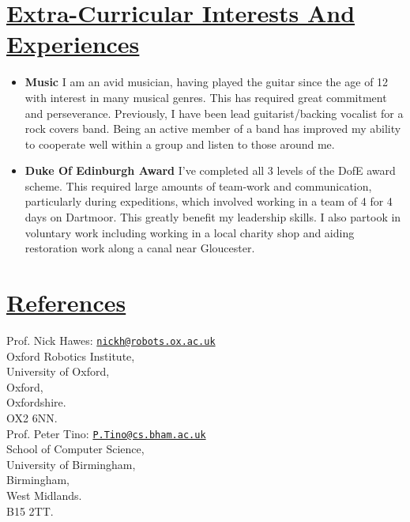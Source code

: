 \documentclass[11pt]{article}
\begin{document}
	\hspace{-100pt}\section*{\underline{Extra-Curricular Interests And Experiences}}
			\begin{itemize}
				\item \textbf{Music} I am an avid musician, having played the guitar since the age of 12 with interest in many musical genres. This has required great commitment and perseverance. Previously, I have been lead guitarist/backing vocalist for a rock covers band. Being an active member of a band has improved my ability to cooperate well within a group and listen to those around me. 
				\item \textbf{Duke Of Edinburgh Award} I've completed all 3 levels of the DofE award scheme. This required large amounts of team-work and communication, particularly during expeditions, which involved working in a team of 4 for 4 days on Dartmoor. This greatly benefit my leadership skills. I also partook in voluntary work including working in a local charity shop and aiding restoration work along a canal near Gloucester.
			\end{itemize}

				
	\vspace{-20pt}
	\hspace{-100pt}\section*{\underline{References}}	
				\begin{multicols}{2}
					\noindent
					Prof. Nick Hawes:  \href{mailto:nickh@robots.ox.ac.uk}{\nolinkurl{nickh@robots.ox.ac.uk}}\\
					Oxford Robotics Institute,\\
					University of Oxford,\\
					Oxford, \\
					Oxfordshire.\\
					OX2 6NN.\\
	
					\noindent
					Prof. Peter Tino:  \href{mailto:P.Tino@cs.bham.ac.uk}{\nolinkurl{P.Tino@cs.bham.ac.uk}}\\
					School of Computer Science,\\
					University of Birmingham,\\
					Birmingham, \\
					West Midlands.\\
					B15 2TT.\\
				\end{multicols}
        \fi
\end{document}
